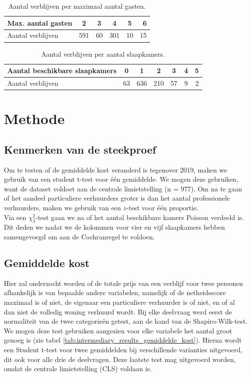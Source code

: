 \documentclass[a4paper]{kulakarticle}
\begin{document}
\begin{table}[h]
	\centering
	\begin{tabular}{|l|c|c|c|c|r|}
		\hline
		Max. aantal gasten&2&3&4&5&6\\[0.5ex]
		\hline
		Aantal verblijven&591&60 &301  &10  &15 \\[0.5ex]
		\hline
	\end{tabular}
	\caption{Aantal verblijven per maximaal aantal gasten.}
	\label{capacity tabel}
\end{table}

\begin{table}[h]
	\centering
	\begin{tabular}{|l|c|c|c|c|c|r|}
		\hline
		Aantal beschikbare slaapkamers&0&1&2&3&4&5\\[0.5ex]
		\hline
		Aantal verblijven&63 &636 &210   &57     &9     &2  \\[0.5ex]
		\hline
	\end{tabular}
	\caption{Aantal verblijven per aantal slaapkamers.}
	\label{bedrooms tabel}
\end{table}


	
	\section{Methode}
	
	\subsection{Kenmerken van de steekproef}
	Om te testen of de gemiddelde kost veranderd is tegenover 2019, maken we gebruik van een student t-test voor één gemiddelde. We mogen deze gebruiken, want de dataset voldoet aan de centrale limietstelling (n = 977). Om na te gaan of het aandeel particuliere verhuurders groter is dan het aantal professionele verhuurders, maken we gebruik van een $z$-test voor één proportie.\\
	Via een $\chi^2_{3}$-test gaan we na of het aantal beschikbare kamers Poisson verdeeld is. Dit deden we nadat we de kolommen voor vier en vijf slaapkamers hebben samengevoegd om aan de Cochranregel te voldoen.
	
	\subsection{Gemiddelde kost}
	
	Hier zal onderzocht worden of de totale prijs van een verblijf voor twee personen afhankelijk is van bepaalde andere variabelen, namelijk of de netheidsscore maximaal is of niet, de eigenaar een particuliere verhuurder is of niet, en of al dan niet de volledig woning verhuurd wordt.
	Bij elke deelvraag werd eerst de normaliteit van de twee categorieën getest, aan de hand van de Shapiro-Wilk-test. We mogen deze test gebruiken aangezien voor elke variabele het aantal groot genoeg is (zie tabel \ref{tab:intermediary_results_gemiddelde_kost}). Hierna wordt een Student t-test voor twee gemiddelden bij verschillende varianties uitgevoerd, dit ook voor alle drie de deelvragen. Deze laatste test mag uitgevoerd worden, omdat de centrale limietstelling (CLS) voldaan is.
\end{document}
